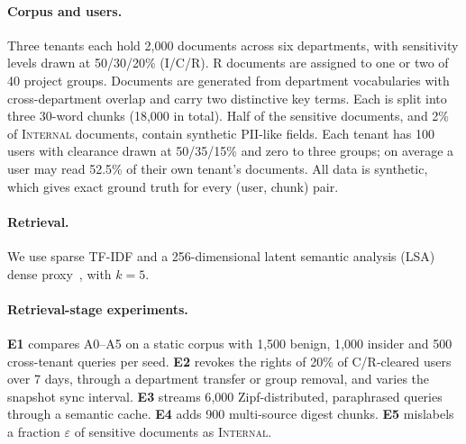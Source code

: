 \documentclass[10pt]{article}
\begin{document}
\paragraph{Corpus and users.}
Three tenants each hold 2{,}000 documents across six departments, with sensitivity levels drawn at 50/30/20\% (\textsc{I}/\textsc{C}/\textsc{R}). \textsc{R} documents are assigned to one or two of 40 project groups. Documents are generated from department vocabularies with cross-department overlap and carry two distinctive key terms. Each is split into three 30-word chunks (18{,}000 in total). Half of the sensitive documents, and 2\% of \textsc{Internal} documents, contain synthetic PII-like fields. Each tenant has 100 users with clearance drawn at 50/35/15\% and zero to three groups; on average a user may read 52.5\% of their own tenant's documents. All data is synthetic, which gives exact ground truth for every (user, chunk) pair.

\paragraph{Retrieval.}
We use sparse TF-IDF and a 256-dimensional latent semantic analysis (LSA) dense proxy~\cite{deerwester1990}, with $k{=}5$.

\paragraph{Retrieval-stage experiments.}
\textbf{E1} compares A0--A5 on a static corpus with 1{,}500 benign, 1{,}000 insider and 500 cross-tenant queries per seed. \textbf{E2} revokes the rights of 20\% of \textsc{C}/\textsc{R}-cleared users over 7 days, through a department transfer or group removal, and varies the snapshot sync interval. \textbf{E3} streams 6{,}000 Zipf-distributed, paraphrased queries through a semantic cache. \textbf{E4} adds 900 multi-source digest chunks. \textbf{E5} mislabels a fraction $\varepsilon$ of sensitive documents as \textsc{Internal}.
\end{document}

